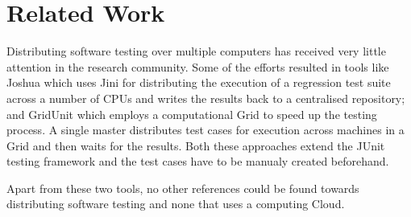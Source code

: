 \section{Related Work}
Distributing software testing over multiple computers has received very little attention in the research community. Some of the efforts resulted in tools like Joshua %
which uses Jini for distributing the execution of a regression test suite across a number of CPUs and writes the results back to a centralised repository; and 
GridUnit %
which employs a computational Grid to speed up the testing process. A single master distributes test cases for execution across machines in a Grid and then waits for the results.
Both these approaches extend the JUnit testing framework and the test cases have to be manualy created beforehand. 

Apart from these two tools, no other references could be found towards distributing software testing and none that uses a computing Cloud. 
